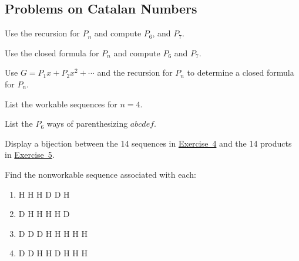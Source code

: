\documentclass[10pt,]{book}
\theoremstyle{plain}
\theoremstyle{definition}
\theoremstyle{definition}
\theoremstyle{definition}
\theoremstyle{definition}
\numberwithin{equation}{chapter}
\begin{document}
\subsection*{Problems on Catalan Numbers}\label{exercises-6}
\begin{divisionexercise}{1}\hypertarget{exercise-51}{}
\hypertarget{p-914}{}%
Use the recursion for \(P_{n}\) and compute \(P_{6}\), and \(P_{7}\).%
\end{divisionexercise}%
\begin{divisionexercise}{2}\hypertarget{exercise-52}{}
\hypertarget{p-915}{}%
Use the closed formula for \(P_n\) and compute \(P_{6}\) and \(P_{7}\).%
\end{divisionexercise}%
\begin{divisionexercise}{3}\hypertarget{exercise-53}{}
\hypertarget{p-916}{}%
Use \(G = P_{1}x + P_{2}x^{2} +\cdots\) and the recursion for \(P_{n}\) to determine a closed formula for \(P_{n}\).%
\end{divisionexercise}%
\begin{divisionexercise}{4}\hypertarget{prob-workseq}{}
\hypertarget{p-917}{}%
List the workable sequences for \(n = 4\).%
\end{divisionexercise}%
\begin{divisionexercise}{5}\hypertarget{prob-parenth}{}
\hypertarget{p-918}{}%
List the \(P_{6}\) ways of parenthesizing \(abcdef\).%
\end{divisionexercise}%
\begin{divisionexercise}{6}\hypertarget{exercise-56}{}
\hypertarget{p-919}{}%
Display a bijection between the 14 sequences in \hyperlink{prob-workseq}{Exercise~4} and the 14 products in \hyperlink{prob-parenth}{Exercise~5}.%
\end{divisionexercise}%
\begin{divisionexercise}{7}\hypertarget{exercise-57}{}
\hypertarget{p-920}{}%
Find the nonworkable sequence associated with each: \leavevmode%
\begin{enumerate}[label=(\alph*)]
\item\hypertarget{li-114}{}\hypertarget{p-921}{}%
H H H D D H%
\item\hypertarget{li-115}{}\hypertarget{p-922}{}%
D H H H H D%
\item\hypertarget{li-116}{}\hypertarget{p-923}{}%
D D D H H H H H%
\item\hypertarget{li-117}{}\hypertarget{p-924}{}%
D D H H D H H H%
\end{enumerate}
%
\end{divisionexercise}%
\end{document}
